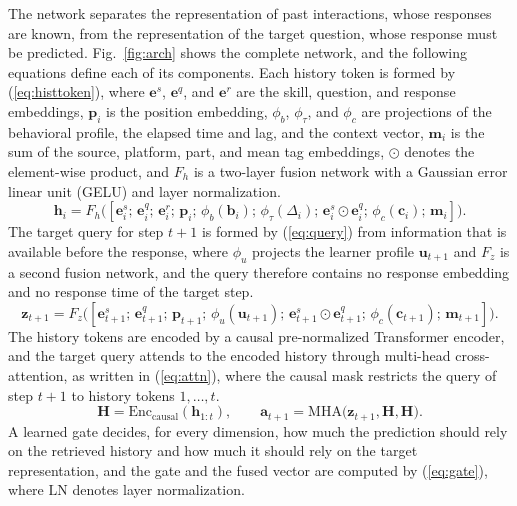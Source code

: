 \documentclass[11pt]{article}
\begin{document}
The network separates the representation of past interactions, whose responses are known, from the representation of the target question, whose response must be predicted. Fig.~\ref{fig:arch} shows the complete network, and the following equations define each of its components. Each history token is formed by (\ref{eq:histtoken}), where $\mathbf{e}^{s}$, $\mathbf{e}^{q}$, and $\mathbf{e}^{r}$ are the skill, question, and response embeddings, $\mathbf{p}_i$ is the position embedding, $\phi_b$, $\phi_\tau$, and $\phi_c$ are projections of the behavioral profile, the elapsed time and lag, and the context vector, $\mathbf{m}_i$ is the sum of the source, platform, part, and mean tag embeddings, $\odot$ denotes the element-wise product, and $F_h$ is a two-layer fusion network with a Gaussian error linear unit (GELU) and layer normalization.
\begin{equation}\label{eq:histtoken}
\mathbf{h}_i = F_h\big([\mathbf{e}^{s}_{i};\, \mathbf{e}^{q}_{i};\, \mathbf{e}^{r}_{i};\, \mathbf{p}_i;\, \phi_b(\mathbf{b}_i);\, \phi_\tau(\Delta_i);\, \mathbf{e}^{s}_{i}\odot\mathbf{e}^{q}_{i};\, \phi_c(\mathbf{c}_i);\, \mathbf{m}_i]\big).
\end{equation}
The target query for step $t+1$ is formed by (\ref{eq:query}) from information that is available before the response, where $\phi_u$ projects the learner profile $\mathbf{u}_{t+1}$ and $F_z$ is a second fusion network, and the query therefore contains no response embedding and no response time of the target step.
\begin{equation}\label{eq:query}
\mathbf{z}_{t+1} = F_z\big([\mathbf{e}^{s}_{t+1};\, \mathbf{e}^{q}_{t+1};\, \mathbf{p}_{t+1};\, \phi_u(\mathbf{u}_{t+1});\, \mathbf{e}^{s}_{t+1}\odot\mathbf{e}^{q}_{t+1};\, \phi_c(\mathbf{c}_{t+1});\, \mathbf{m}_{t+1}]\big).
\end{equation}
The history tokens are encoded by a causal pre-normalized Transformer encoder, and the target query attends to the encoded history through multi-head cross-attention, as written in (\ref{eq:attn}), where the causal mask restricts the query of step $t+1$ to history tokens $1,\dots,t$.
\begin{equation}\label{eq:attn}
\mathbf{H} = \mathrm{Enc}_{\text{causal}}(\mathbf{h}_{1:t}), \qquad \mathbf{a}_{t+1} = \mathrm{MHA}\big(\mathbf{z}_{t+1}, \mathbf{H}, \mathbf{H}\big).
\end{equation}
A learned gate decides, for every dimension, how much the prediction should rely on the retrieved history and how much it should rely on the target representation, and the gate and the fused vector are computed by (\ref{eq:gate}), where $\mathrm{LN}$ denotes layer normalization.
\end{document}
